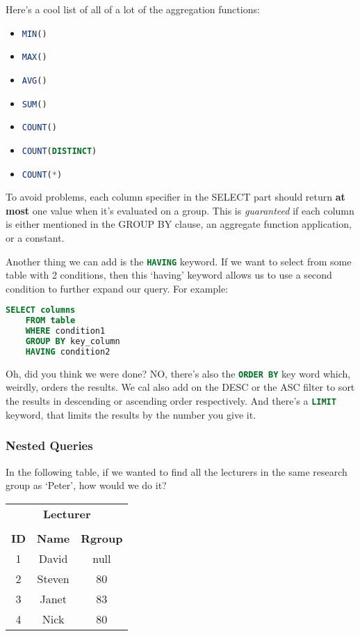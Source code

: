 \documentclass[11pt,a4paper,titlepage,dvipsnames,cmyk]{scrartcl}
\begin{document}
Here's a cool list of all of a lot of the aggregation functions:

\begin{itemize}
    \item \lstinline[language=SQL]|MIN()| 
    \item \lstinline[language=SQL]|MAX()| 
    \item \lstinline[language=SQL]|AVG()| 
    \item \lstinline[language=SQL]|SUM()| 
    \item \lstinline[language=SQL]|COUNT()| 
    \item \lstinline[language=SQL]|COUNT(DISTINCT)| 
    \item \lstinline[language=SQL]|COUNT(*)| 
\end{itemize}

To avoid problems, each column specifier in the SELECT part should return
\textbf{at most} one value when it's evaluated on a group. This is 
\textit{guaranteed} if each column is either mentioned in the GROUP BY
clause, an aggregate function application, or a constant.

Another thing we can add is the \lstinline[language=SQL]|HAVING| keyword.
If we want to select from some table with 2 conditions, then this `having'
keyword allows us to use a second condition to further expand our query.
For example:

\begin{lstlisting}[language=SQL]
SELECT columns
    FROM table
    WHERE condition1
    GROUP BY key_column
    HAVING condition2
\end{lstlisting}

Oh, did you think we were done? NO, there's also the
\lstinline[language=SQL]|ORDER BY| key word which, weirdly, orders the
results. We cal also add on the DESC or the ASC filter to sort the results
in descending or ascending order respectively. And there's a
\lstinline[language=SQL]|LIMIT| keyword, that limits the results by the
number you give it.

\subsubsection{Nested Queries}%
\label{ssub:nested-queries}
In the following table, if we wanted to find all the lecturers in the same
research group as `Peter', how would we do it?

\begin{center}
    \begin{tabular}{|c|c|c|}
        \multicolumn{3}{c}{\textbf{Lecturer}} \\
        \multicolumn{3}{c}{} \\ \hline
        \textbf{ID} & \textbf{Name} & \textbf{Rgroup} \\ \hhline{|=|=|=|}
        1 & David & null \\ \hline
        2 & Steven & 80 \\ \hline
        3 & Janet & 83 \\ \hline
        4 & Nick & 80 \\ \hline
    \end{tabular}
\end{center}
\end{document}
